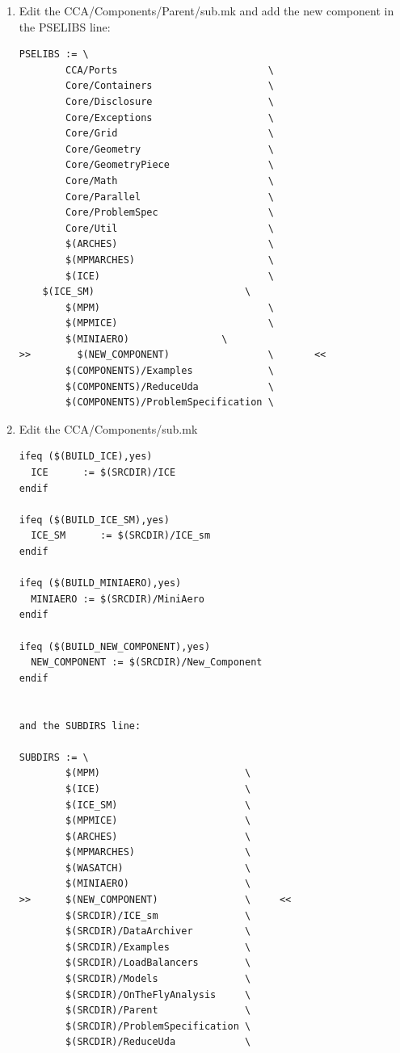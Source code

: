 \documentclass[12pt]{report}
\begin{document}
\begin{enumerate}
\item  Edit the CCA/Components/Parent/sub.mk and add the new component
  in the PSELIBS line:
\begin{verbatim}
PSELIBS := \
        CCA/Ports                          \
        Core/Containers                    \
        Core/Disclosure                    \
        Core/Exceptions                    \
        Core/Grid                          \
        Core/Geometry                      \
        Core/GeometryPiece                 \
        Core/Math                          \
        Core/Parallel                      \
        Core/ProblemSpec                   \
        Core/Util                          \
        $(ARCHES)                          \
        $(MPMARCHES)                       \
        $(ICE)                             \
	$(ICE_SM)                          \
        $(MPM)                             \
        $(MPMICE)                          \
        $(MINIAERO)		           \
>>        $(NEW_COMPONENT)                 \       <<
        $(COMPONENTS)/Examples             \
        $(COMPONENTS)/ReduceUda            \
        $(COMPONENTS)/ProblemSpecification \
\end{verbatim}

\item Edit the CCA/Components/sub.mk

\begin{verbatim}
ifeq ($(BUILD_ICE),yes)
  ICE      := $(SRCDIR)/ICE
endif

ifeq ($(BUILD_ICE_SM),yes)
  ICE_SM      := $(SRCDIR)/ICE_sm
endif

ifeq ($(BUILD_MINIAERO),yes)
  MINIAERO := $(SRCDIR)/MiniAero
endif

ifeq ($(BUILD_NEW_COMPONENT),yes)
  NEW_COMPONENT := $(SRCDIR)/New_Component
endif


and the SUBDIRS line:

SUBDIRS := \
        $(MPM)                         \
        $(ICE)                         \
        $(ICE_SM)                      \
        $(MPMICE)                      \
        $(ARCHES)                      \
        $(MPMARCHES)                   \
        $(WASATCH)                     \
        $(MINIAERO)                    \
>>      $(NEW_COMPONENT)               \     <<
        $(SRCDIR)/ICE_sm               \
        $(SRCDIR)/DataArchiver         \
        $(SRCDIR)/Examples             \
        $(SRCDIR)/LoadBalancers        \
        $(SRCDIR)/Models               \
        $(SRCDIR)/OnTheFlyAnalysis     \
        $(SRCDIR)/Parent               \
        $(SRCDIR)/ProblemSpecification \
        $(SRCDIR)/ReduceUda            \
\end{verbatim}


\end{enumerate}
\end{document}
